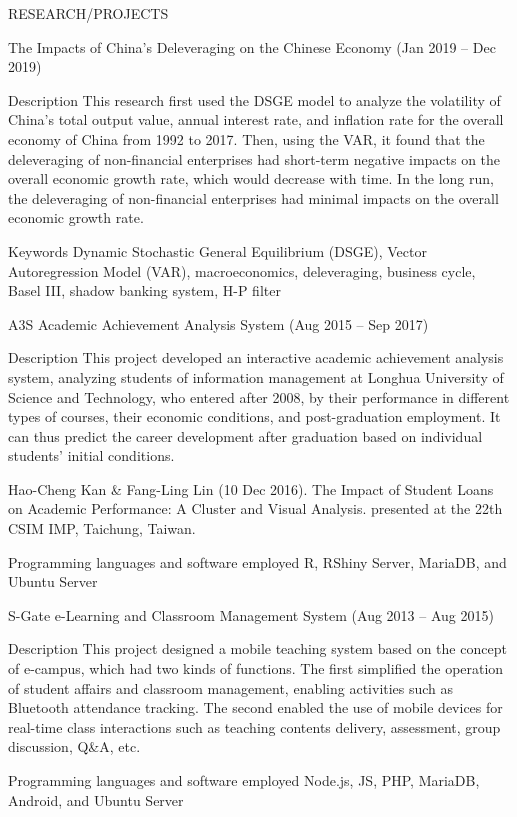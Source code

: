 \documentclass{resume} %
\begin{document}
\begin{rSection}{RESEARCH/PROJECTS}

\begin{rSubSectionTitleList}{The Impacts of China’s Deleveraging on the Chinese Economy (Jan 2019 – Dec 2019)}
\item Description This research first used the DSGE model to analyze the volatility of China's total output value, annual interest rate, and inflation rate for the overall economy of China from 1992 to 2017. Then, using the VAR, it found that the deleveraging of non-financial enterprises had short-term negative impacts on the overall economic growth rate, which would decrease with time. In the long run, the deleveraging of non-financial enterprises had minimal impacts on the overall economic growth rate.
\item Keywords Dynamic Stochastic General Equilibrium (DSGE), Vector Autoregression Model (VAR), macroeconomics, deleveraging, business cycle, Basel III, shadow banking system, H-P filter
\end{rSubSectionTitleList}

\begin{rSubSectionTitleList}{A3S Academic Achievement Analysis System (Aug 2015 – Sep 2017)}
\item Description This project developed an interactive academic achievement analysis system, analyzing students of information management at Longhua University of Science and Technology, who entered after 2008, by their performance in different types of courses, their economic conditions, and post-graduation employment. It can thus predict the career development after graduation based on individual students’ initial conditions.
\item Hao-Cheng Kan \& Fang-Ling Lin (10 Dec 2016). The Impact of Student Loans on Academic Performance: A Cluster and Visual Analysis. presented at the 22th CSIM IMP, Taichung, Taiwan.
\item Programming languages and software employed R, RShiny Server, MariaDB, and Ubuntu Server
\end{rSubSectionTitleList}

\begin{rSubSectionTitleList}{S-Gate e-Learning and Classroom Management System (Aug 2013 – Aug 2015)}
\item Description This project designed a mobile teaching system based on the concept of e-campus, which had two kinds of functions. The first simplified the operation of student affairs and classroom management, enabling activities such as Bluetooth attendance tracking. The second enabled the use of mobile devices for real-time class interactions such as teaching contents delivery, assessment, group discussion, Q\&A, etc.
\item Programming languages and software employed Node.js, JS, PHP, MariaDB, Android, and Ubuntu Server

\end{rSubSectionTitleList}
\end{rSection}




\end{document}
